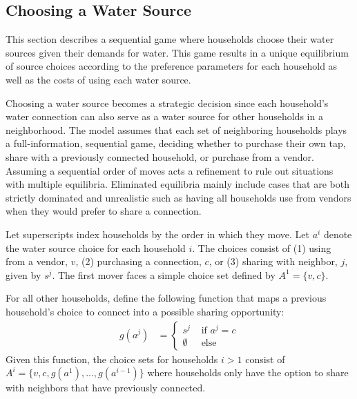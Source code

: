 \documentclass[12pt]{article}
\begin{document}
\subsection{Choosing a Water Source}\label{section:watersourcechoice}

This section describes a sequential game where households choose their water sources given their demands for water.  This game results in a unique equilibrium of source choices according to the preference parameters for each household as well as the costs of using each water source.  


Choosing a water source becomes a strategic decision since each household's water connection can also serve as a water source for other households in a neighborhood.  The model assumes that each set of neighboring households plays a full-information, sequential game, deciding whether to purchase their own tap, share with a previously connected household, or purchase from a vendor.  Assuming a sequential order of moves acts a refinement to rule out situations with multiple equilibria.  Eliminated equilibria mainly include cases that are both strictly dominated and unrealistic such as having all households use from vendors when they would prefer to share a connection.

Let superscripts index households by the order in which they move.  Let $a^{i}$ denote the water source choice for each household $i$.  The choices consist of (1) using from a vendor, $v$, (2) purchasing a connection, $c$, or (3) sharing with neighbor, $j$, given by $s^{j}$.  The first mover faces a simple choice set defined by $A^{1} = \{  v, c  \}$.

For all other households, define the following function that maps a previous household's choice to connect into a possible sharing opportunity:
\begin{align*}
g( a^{j} ) &=
\begin{cases}
s^j        &  \text{ if } a^{j} = c \\
\emptyset  &  \text{ else } 
\end{cases}
\end{align*}
Given this function, the choice sets for households $i>1$ consist of $A^{i} = \{ v,c,g(a^{1}),...,g(a^{i-1}) \} $ where households only have the option to share with neighbors that have previously connected.  
\end{document}
